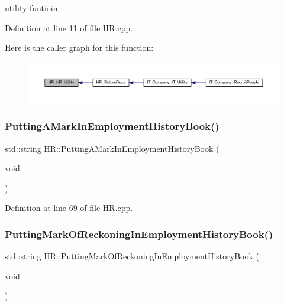 utility funtioin 



Definition at line 11 of file H\+R.\+cpp.

Here is the caller graph for this function\+:
\nopagebreak
\begin{figure}[H]
\begin{center}
\leavevmode
\includegraphics[width=350pt]{class_h_r_a55cb339b18d5eac3fb3a7a9a260d5f98_icgraph}
\end{center}
\end{figure}
\mbox{\label{class_h_r_aacf64628213ae72aa5ff5a1b44e829fa}} 
\subsubsection{\texorpdfstring{Putting\+A\+Mark\+In\+Employment\+History\+Book()}{PuttingAMarkInEmploymentHistoryBook()}}
{\footnotesize\ttfamily std\+::string H\+R\+::\+Putting\+A\+Mark\+In\+Employment\+History\+Book (\begin{DoxyParamCaption}\item[{void}]{ }\end{DoxyParamCaption})}



Definition at line 69 of file H\+R.\+cpp.

\mbox{\label{class_h_r_a3f962907d6ed8e81da66d4608ff3660d}} 
\subsubsection{\texorpdfstring{Putting\+Mark\+Of\+Reckoning\+In\+Employment\+History\+Book()}{PuttingMarkOfReckoningInEmploymentHistoryBook()}}
{\footnotesize\ttfamily std\+::string H\+R\+::\+Putting\+Mark\+Of\+Reckoning\+In\+Employment\+History\+Book (\begin{DoxyParamCaption}\item[{void}]{ }\end{DoxyParamCaption})}



